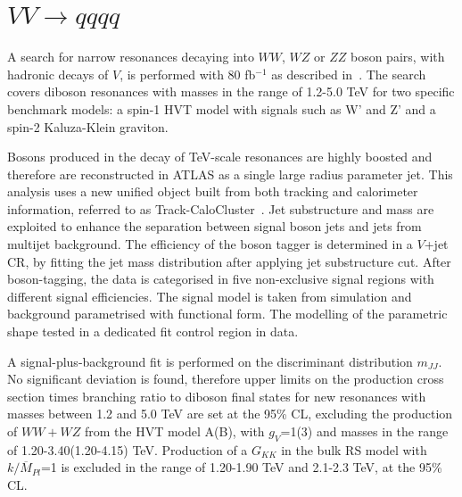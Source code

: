 \documentclass{PoS}
\begin{document}
\section{$VV\rightarrow qqqq$}
\label{sec:VV}
A search for narrow resonances decaying into $WW$, $WZ$ or $ZZ$ boson pairs, with hadronic decays of $V$, is performed with 80 fb$^{-1}$ as described in~\cite{ATLAS-CONF-2018-016}. The search covers diboson resonances with masses in the range of 1.2-5.0 TeV for two specific benchmark models: a spin-1 HVT model with signals such as W' and Z' and a spin-2 Kaluza-Klein graviton.

Bosons produced in the decay of TeV-scale resonances are highly boosted and therefore are reconstructed in ATLAS as a single large radius parameter jet. 
This analysis uses a new unified object built from both tracking and calorimeter information, referred to as Track-CaloCluster~\cite{ATL-PHYS-PUB-2017-015}. 
Jet substructure and mass are exploited to enhance the separation between signal boson jets and jets from multijet background. 
The efficiency of the boson tagger is determined in a $V$+jet CR, by fitting the jet mass distribution after applying jet substructure cut. %
After boson-tagging, the data is categorised in five non-exclusive signal regions with different signal efficiencies.
The signal model is taken from simulation and background parametrised with functional form. 
The modelling of the parametric shape tested in a dedicated fit control region in data.

A signal-plus-background fit is performed on the discriminant distribution $m_{JJ}$.
No significant deviation is found, therefore upper limits on the production cross section times branching ratio to diboson final states for new resonances with masses between 1.2 and 5.0 TeV are set at the 95\% CL, excluding the production of $WW+WZ$ from the HVT model A(B), with $g_V$=1(3) and masses in the range of 1.20-3.40(1.20-4.15) TeV. 
Production of a $G_{KK}$ in the bulk RS model with $k/\overline{M}_{Pl}$=1 is excluded in the range of 1.20-1.90 TeV and 2.1-2.3 TeV, at the 95\% CL.
\end{document}
